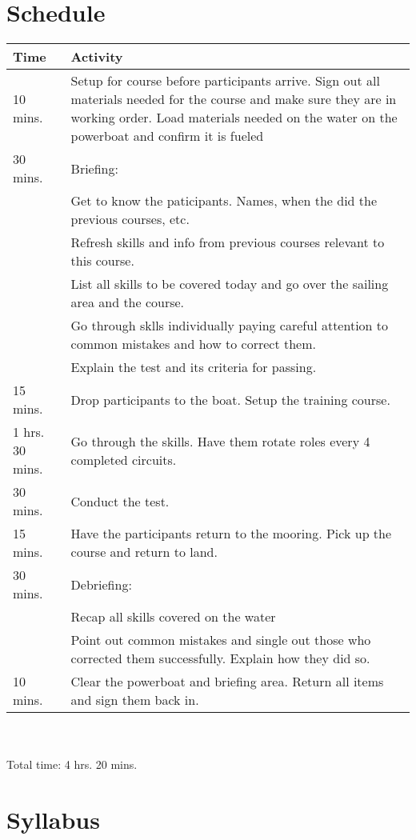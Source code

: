 \documentclass[12pt]{scrartcl}
\begin{document}
\section{Schedule} \label{sec:schedule}

\label{tab:schedule}
\begin{tabularx}{\textwidth}{|X|X|}
	\hline
	\textbf{Time} & \textbf{Activity} \\
	\hline
	10 mins. & Setup for course before participants arrive. Sign out all materials needed for the course and make sure they are in working order. Load materials needed on the water on the powerboat and confirm it is fueled \\
	\hline
	30 mins. & Briefing: \\
	& Get to know the paticipants. Names, when the did the previous courses, etc. \\
	& Refresh skills and info from previous courses relevant to this course. \\
	& List all skills to be covered today and go over the sailing area and the course. \\
	& Go through sklls individually paying careful attention to common mistakes and how to correct them. \\
	& Explain the test and its criteria for passing. \\
	\hline
	15 mins. & Drop participants to the boat. Setup the training course. \\
	\hline
	1 hrs. 30 mins. & Go through the skills. Have them rotate roles every 4 completed circuits. \\
	\hline
	30 mins. & Conduct the test. \\
	\hline
	15 mins. & Have the participants return to the mooring. Pick up the course and return to land. \\
	\hline
	30 mins. & Debriefing: \\
	& Recap all skills covered on the water \\
	& Point out common mistakes and single out those who corrected them successfully. Explain how they did so. \\
	\hline
	10 mins. & Clear the powerboat and briefing area. Return all items and sign them back in. \\
	\hline
\end{tabularx}
\\
\\
Total time: 4 hrs. 20 mins.

\newpage

\section{Syllabus} \label{sec:syllabus}
\end{document}
